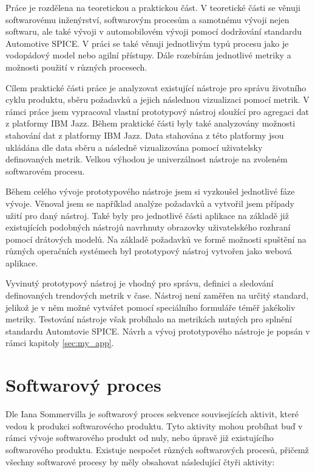 \documentclass[czech,master]{diploma}
\begin{document}
Práce je rozdělena na teoretickou a praktickou část. V teoretické části se věnuji softwarovému inženýrství, softwarovým procesům a samotnému vývoji nejen softwaru, ale také vývoji v automobilovém vývoji pomocí dodržování standardu Automotive SPICE. V práci se také věnuji jednotlivým typů procesu jako je vodopádový model nebo agilní přístupy. Dále rozebírám jednotlivé metriky a možnosti použití v různých procesech.

Cílem praktické části práce je analyzovat existující nástroje pro správu životního cyklu produktu, sběru požadavků a jejich následnou vizualizaci pomocí metrik. V rámci práce jsem vypracoval vlastní prototypový nástroj sloužící pro agregaci dat z platformy IBM Jazz. Během praktické části byly také analyzovány možnosti stahování dat z platformy IBM Jazz. Data stahována z této platformy jsou ukládána dle data sběru a následně vizualizována pomocí uživatelsky definovaných metrik. Velkou výhodou je univerzálnost nástroje na zvoleném softwarovém procesu.

Během celého vývoje prototypového nástroje jsem si vyzkoušel jednotlivé fáze vývoje. Věnoval jsem se například analýze požadavků a vytvořil jsem případy užití pro daný nástroj. Také byly pro jednotlivé části aplikace na základě již existujících podobných nástrojů navrhnuty obrazovky uživatelského rozhraní pomocí drátových modelů. Na základě požadavků ve formě možnosti spuštění na různých operačních systémech byl prototypový nástroj vytvořen jako webová aplikace.

Vyvinutý prototypový nástroj je vhodný pro správu, definici a sledování definovaných trendových metrik v čase. Nástroj není zaměřen na určitý standard, jelikož je v něm možné vytvářet pomocí speciálního formuláře téměř jakékoliv metriky. Testování nástroje však probíhalo na metrikách nutných pro splnění standardu Automtovie SPICE. Návrh a vývoj prototypového nástroje je popsán v rámci kapitoly \ref{sec:my_app}.

\chapter{Softwarový proces}
\label{sec:sw_process}

Dle Iana Sommervilla \cite{ref:sommerrville_sw_process} je softwarový proces sekvence souvisejících aktivit, které vedou k produkci softwarovécho produktu. Tyto aktivity mohou probíhat buď v rámci vývoje softwarového produkt od nuly, nebo úpravě již existujícího softwarového produktu. Existuje nespočet různých softwarových procesů, přičemž všechny softwarové procesy by měly obsahovat následující čtyři aktivity:
\end{document}
